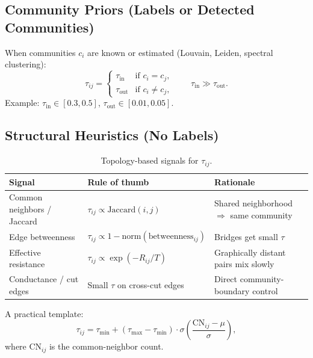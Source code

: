 \documentclass[11pt,a4paper]{report}
\begin{document}
\subsection{Community Priors (Labels or Detected Communities)}

When communities $c_i$ are known or estimated (Louvain, Leiden, spectral clustering):
\begin{equation}
    \tau_{ij} =
    \begin{cases}
        \tau_{\mathrm{in}}  & \text{if } c_i = c_j, \\
        \tau_{\mathrm{out}} & \text{if } c_i \neq c_j,
    \end{cases}
    \qquad \tau_{\mathrm{in}} \gg \tau_{\mathrm{out}}.
\end{equation}
Example: $\tau_{\mathrm{in}} \in [0.3, 0.5]$, $\tau_{\mathrm{out}} \in [0.01, 0.05]$.

\subsection{Structural Heuristics (No Labels)}

\begin{table}[h]
\centering
\caption{Topology-based signals for $\tau_{ij}$.}
\begin{tabular}{@{}lll@{}}
\toprule
\textbf{Signal} & \textbf{Rule of thumb} & \textbf{Rationale} \\
\midrule
Common neighbors / Jaccard & $\tau_{ij} \propto \mathrm{Jaccard}(i,j)$ & Shared neighborhood $\Rightarrow$ same community \\
Edge betweenness            & $\tau_{ij} \propto 1 - \mathrm{norm}(\mathrm{betweenness}_{ij})$ & Bridges get small $\tau$ \\
Effective resistance        & $\tau_{ij} \propto \exp(-R_{ij}/T)$ & Graphically distant pairs mix slowly \\
Conductance / cut edges     & Small $\tau$ on cross-cut edges         & Direct community-boundary control \\
\bottomrule
\end{tabular}
\end{table}

A practical template:
\begin{equation}
    \tau_{ij} = \tau_{\min} + (\tau_{\max}-\tau_{\min})\cdot \sigma\!\left(\frac{\mathrm{CN}_{ij}-\mu}{\sigma}\right),
\end{equation}
where $\mathrm{CN}_{ij}$ is the common-neighbor count.
\end{document}
